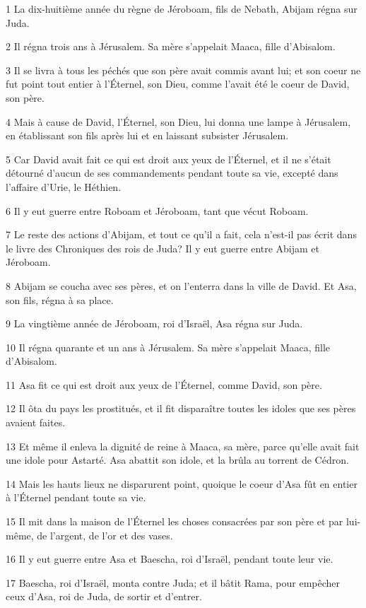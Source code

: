 \par 1 La dix-huitième année du règne de Jéroboam, fils de Nebath, Abijam régna sur Juda.
\par 2 Il régna trois ans à Jérusalem. Sa mère s'appelait Maaca, fille d'Abisalom.
\par 3 Il se livra à tous les péchés que son père avait commis avant lui; et son coeur ne fut point tout entier à l'Éternel, son Dieu, comme l'avait été le coeur de David, son père.
\par 4 Mais à cause de David, l'Éternel, son Dieu, lui donna une lampe à Jérusalem, en établissant son fils après lui et en laissant subsister Jérusalem.
\par 5 Car David avait fait ce qui est droit aux yeux de l'Éternel, et il ne s'était détourné d'aucun de ses commandements pendant toute sa vie, excepté dans l'affaire d'Urie, le Héthien.
\par 6 Il y eut guerre entre Roboam et Jéroboam, tant que vécut Roboam.
\par 7 Le reste des actions d'Abijam, et tout ce qu'il a fait, cela n'est-il pas écrit dans le livre des Chroniques des rois de Juda? Il y eut guerre entre Abijam et Jéroboam.
\par 8 Abijam se coucha avec ses pères, et on l'enterra dans la ville de David. Et Asa, son fils, régna à sa place.
\par 9 La vingtième année de Jéroboam, roi d'Israël, Asa régna sur Juda.
\par 10 Il régna quarante et un ans à Jérusalem. Sa mère s'appelait Maaca, fille d'Abisalom.
\par 11 Asa fit ce qui est droit aux yeux de l'Éternel, comme David, son père.
\par 12 Il ôta du pays les prostitués, et il fit disparaître toutes les idoles que ses pères avaient faites.
\par 13 Et même il enleva la dignité de reine à Maaca, sa mère, parce qu'elle avait fait une idole pour Astarté. Asa abattit son idole, et la brûla au torrent de Cédron.
\par 14 Mais les hauts lieux ne disparurent point, quoique le coeur d'Asa fût en entier à l'Éternel pendant toute sa vie.
\par 15 Il mit dans la maison de l'Éternel les choses consacrées par son père et par lui-même, de l'argent, de l'or et des vases.
\par 16 Il y eut guerre entre Asa et Baescha, roi d'Israël, pendant toute leur vie.
\par 17 Baescha, roi d'Israël, monta contre Juda; et il bâtit Rama, pour empêcher ceux d'Asa, roi de Juda, de sortir et d'entrer.
